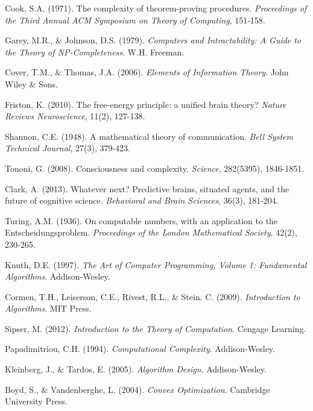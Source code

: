 \documentclass[11pt]{article}
\begin{document}

\begin{thebibliography}{99}

Cook, S.A. (1971). The complexity of theorem-proving procedures. \textit{Proceedings of the Third Annual ACM Symposium on Theory of Computing}, 151-158.

Garey, M.R., \& Johnson, D.S. (1979). \textit{Computers and Intractability: A Guide to the Theory of NP-Completeness}. W.H. Freeman.

Cover, T.M., \& Thomas, J.A. (2006). \textit{Elements of Information Theory}. John Wiley \& Sons.

Friston, K. (2010). The free-energy principle: a unified brain theory? \textit{Nature Reviews Neuroscience}, 11(2), 127-138.

Shannon, C.E. (1948). A mathematical theory of communication. \textit{Bell System Technical Journal}, 27(3), 379-423.

Tononi, G. (2008). Consciousness and complexity. \textit{Science}, 282(5395), 1846-1851.

Clark, A. (2013). Whatever next? Predictive brains, situated agents, and the future of cognitive science. \textit{Behavioral and Brain Sciences}, 36(3), 181-204.

Turing, A.M. (1936). On computable numbers, with an application to the Entscheidungsproblem. \textit{Proceedings of the London Mathematical Society}, 42(2), 230-265.

Knuth, D.E. (1997). \textit{The Art of Computer Programming, Volume 1: Fundamental Algorithms}. Addison-Wesley.

Cormen, T.H., Leiserson, C.E., Rivest, R.L., \& Stein, C. (2009). \textit{Introduction to Algorithms}. MIT Press.

Sipser, M. (2012). \textit{Introduction to the Theory of Computation}. Cengage Learning.

Papadimitriou, C.H. (1994). \textit{Computational Complexity}. Addison-Wesley.

Kleinberg, J., \& Tardos, E. (2005). \textit{Algorithm Design}. Addison-Wesley.

Boyd, S., \& Vandenberghe, L. (2004). \textit{Convex Optimization}. Cambridge University Press.


\end{thebibliography}
\end{document}
